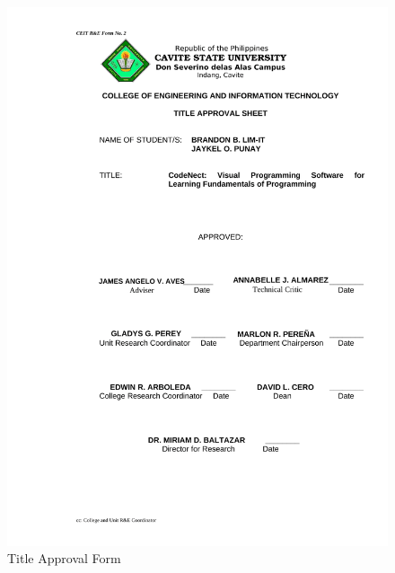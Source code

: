 \begin{figure}[H]
	 \centering
	 \includegraphics[width=\textwidth]{figures/2_title_approval.png}
	 \caption[]{Title Approval Form}
	 \label{fig:title_approval}
\end{figure}
\clearpage
\null\vfill

